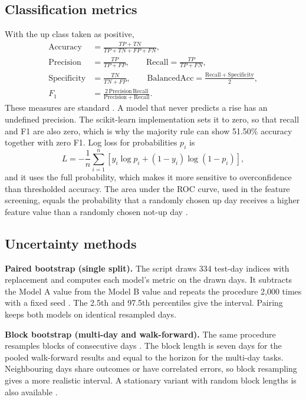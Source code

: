 \subsection{Classification metrics}
With the up class taken as positive,
\begin{align}
\mathrm{Accuracy} &= \frac{TP+TN}{TP+TN+FP+FN},\\
\mathrm{Precision} &= \frac{TP}{TP+FP},\qquad
\mathrm{Recall} = \frac{TP}{TP+FN},\\
\mathrm{Specificity} &= \frac{TN}{TN+FP},\qquad
\mathrm{BalancedAcc} = \frac{\mathrm{Recall}+\mathrm{Specificity}}{2},\\
F_1 &= \frac{2\,\mathrm{Precision}\,\mathrm{Recall}}{\mathrm{Precision}+\mathrm{Recall}}.
\end{align}
These measures are standard \cite{sokolova2009,brodersen2010}. A model that never predicts a rise has an undefined precision. The scikit-learn implementation sets it to zero, so that recall and F1 are also zero, which is why the majority rule can show 51.50\% accuracy together with zero F1. Log loss for probabilities $p_i$ is
\begin{equation}
L=-\frac{1}{n}\sum_{i=1}^{n}\left[y_i\log p_i+(1-y_i)\log(1-p_i)\right],
\end{equation}
and it uses the full probability, which makes it more sensitive to overconfidence than thresholded accuracy. The area under the ROC curve, used in the feature screening, equals the probability that a randomly chosen up day receives a higher feature value than a randomly chosen not-up day \cite{fawcett2006}.

\subsection{Uncertainty methods}
\textbf{Paired bootstrap (single split).} The script draws 334 test-day indices with replacement and computes each model's metric on the drawn days. It subtracts the Model A value from the Model B value and repeats the procedure 2,000 times with a fixed seed \cite{efron1993}. The 2.5th and 97.5th percentiles give the interval. Pairing keeps both models on identical resampled days.

\textbf{Block bootstrap (multi-day and walk-forward).} The same procedure resamples blocks of consecutive days \cite{kunsch1989}. The block length is seven days for the pooled walk-forward results and equal to the horizon for the multi-day tasks. Neighbouring days share outcomes or have correlated errors, so block resampling gives a more realistic interval. A stationary variant with random block lengths is also available \cite{politis1994}.

